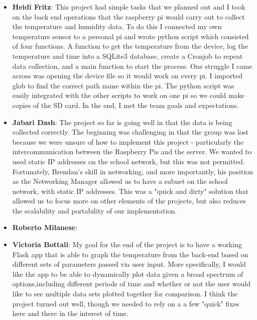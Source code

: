 \documentclass{article}
\begin{document}
\begin{itemize}
				
				\item {\bfseries Heidi Fritz}: This project had simple tasks that we planned out and I took on the back end operations that the raspberry pi would 
				carry out to collect the temperature and humidity data.  To do this I connected my own temperature sensor to a personal pi and wrote 
				python script which consisted of four functions.  A function to get the temperature from the device, log the temperature and time into a 
				SQLite3 database, create a Cronjob to repeat data collection, and a main function to start the process.  One struggle I came across was 
				opening the device file so it would work on every pi.  I imported glob to find the correct path name within the pi.  The python script 
				was easily integrated with the other scripts to work on one pi so we could make copies of the SD card.  In the end, I met the team goals 
				and expectations.
				\item {\bfseries Jabari Dash}: The project so far is going well in that the data is being collected correctly.
									The beginning was challenging in that the group was lost because we were unsure of how to 
									implement this project - particularly the intercommunication between the 
									Raspberry Pis and the server. We wanted to used static IP addresses on the 
									school network, but this was not permitted. Fortunately, Brendan's skill in networking,
									and more importantly, his position as the Networking Manager allowed us to have a subnet
									on the school network, with static IP addresses. This was a "quick and dirty" solution that 
									allowed us to focus more on other elements of the projects, but also reduces the scalability
									and portability of our implementation.
				\item {\bfseries Roberto Milanese}:
				\item {\bfseries Victoria Bottali}:	My goal for the end of the project is to have a working Flask app that is able to graph 
										the temperature from the back-end based on different sets of parameters passed via user input. More 				
										specifically, I would like the app to be able to dynamically plot data given a broad spectrum of 
										options,including different periods of time and whether or not the user would like to see multiple data sets 
										plotted together for comparison. I think the project turned out well, though we needed 
										to rely on a a few "quick" fixes here and there in the interest of time.   	
			\end{itemize}
			
\end{document}
